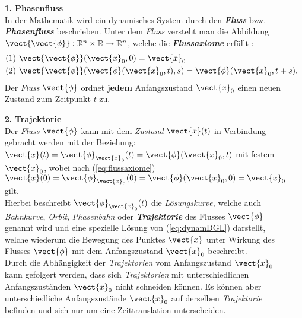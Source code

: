\begin{itemize}
    \item[\textbf{1.}]\textbf{Phasenfluss}\\
    In der Mathematik wird ein dynamisches System durch den \textit{\textbf{Fluss}} bzw. \textit{\textbf{Phasenfluss}}  beschrieben. Unter dem \textit{Fluss} versteht man die Abbildung $\vect{\vect{\phi}}:\mathbb{R}^n\times\mathbb{R}\rightarrow\mathbb{R}^n$, welche die \textit{\textbf{Flussaxiome}} erfüllt \citep{Mat1}:
    \begin{gather}
        \begin{aligned}
            (1)~&\vect{\vect{\phi}}(\vect{x}_0,0)=\vect{x}_0\\
            (2)~&\vect{\vect{\phi}}(\vect{\phi}(\vect{x}_0,t),s)=\vect{\phi}(\vect{x}_0,t+s).
            \label{eq:flussaxiome}
        \end{aligned}
    \end{gather}
    Der \textit{Fluss} $\vect{\phi}$ ordnet \textbf{jedem} Anfangszustand $\vect{x}_0$ einen neuen Zustand zum Zeitpunkt $t$ zu. \citep{Lueck}\\

    \item[\textbf{2.}]\textbf{Trajektorie}\\
    Der \textit{Fluss} $\vect{\phi}$ kann mit dem \textit{Zustand} $\vect{x}(t)$ in Verbindung gebracht werden mit der Beziehung: $\vect{x}(t)=\vect{\phi}_{\vect{x}_0}(t)=\vect{\phi}(\vect{x}_0,t)$ mit festem $\vect{x}_0$, wobei nach  (\ref{eq:flussaxiome}) $\vect{x}(0)=\vect{\phi}_{\vect{x}_0}(0)=\vect{\phi}(\vect{x}_0,0)=\vect{x}_0$ gilt.\\
    Hierbei beschreibt $\vect{\phi}_{\vect{x}_0}(t)$ die \textit{Lösungskurve}, welche auch \textit{Bahnkurve}, \textit{Orbit}, \textit{Phasenbahn} oder \textit{\textbf{Trajektorie}} des Flusses $\vect{\phi}$ genannt wird und eine spezielle Lösung von (\ref{eq:dynamDGL}) darstellt, welche wiederum die Bewegung des Punktes $\vect{x}$ unter Wirkung des Flusses $\vect{\phi}$ mit dem Anfangszustand $\vect{x}_0$ beschreibt. \citep{Lueck}\\
    Durch die Abhängigkeit der \textit{Trajektorien} vom Anfangszustand $\vect{x}_0$ kann gefolgert werden, dass sich \textit{Trajektorien} mit unterschiedlichen Anfangszuständen $\vect{x}_0$ nicht schneiden können. Es können aber unterschiedliche Anfangszustände $\vect{x}_0$ auf derselben \textit{Trajektorie} befinden und sich nur um eine Zeittranslation unterscheiden. \citep{Mat1}\\


\end{itemize}
